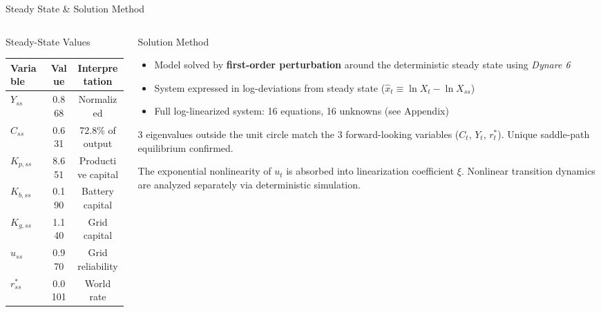 \documentclass[aspectratio=169,10pt]{beamer}
\begin{document}
\begin{frame}{Steady State \& Solution Method}
	\begin{columns}[T]
		\begin{column}{0.47\textwidth}
			\begin{block}{Steady-State Values}
				\centering\small
				\renewcommand{\arraystretch}{1.2}
				\begin{tabular}{@{}lcc@{}}
					\toprule
					\textbf{Variable} & \textbf{Value} & \textbf{Interpretation}\\
					\midrule
					$Y_{ss}$      & 0.868 & Normalized\\
					$C_{ss}$      & 0.631 & 72.8\% of output\\
					$K_{p,ss}$    & 8.651 & Productive capital\\
					$K_{b,ss}$    & 0.190 & Battery capital\\
					$K_{g,ss}$    & 1.140 & Grid capital\\
					$u_{ss}$      & 0.970 & Grid reliability\\
					$r^*_{ss}$    & 0.0101 & World rate\\
					\bottomrule
				\end{tabular}
			\end{block}
		\end{column}
		\begin{column}{0.47\textwidth}
			\begin{block}{Solution Method}
				\begin{itemize}\small
					\item Model solved by \textbf{first-order perturbation} around the deterministic steady state using \textit{Dynare 6}
					\item System expressed in log-deviations from steady state ($\hat{x}_t \equiv \ln X_t - \ln X_{ss}$)
					\item Full log-linearized system: 16 equations, 16 unknowns (see Appendix)
				\end{itemize}
			\end{block}
			\vspace{0.3em}
			\begin{keybox}[title=Blanchard-Kahn Verified]
				\small 3 eigenvalues outside the unit circle match the 3 forward-looking variables ($C_t$, $Y_t$, $r^*_t$). Unique saddle-path equilibrium confirmed. \checkmark
			\end{keybox}
			\vspace{0.2em}
			\begin{alertbox}
				\scriptsize The exponential nonlinearity of $u_t$ is absorbed into linearization coefficient $\xi$. Nonlinear transition dynamics are analyzed separately via deterministic simulation.
			\end{alertbox}
		\end{column}
	\end{columns}
\end{frame}
\end{document}
